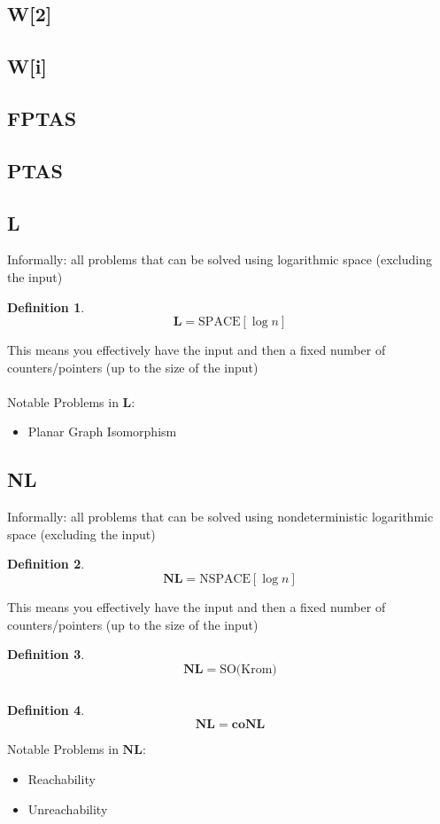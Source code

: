 \documentclass[]{article}
\theoremstyle{definition}
\newtheorem{definition}{Definition}[section]
\begin{document}
\subsection{W[2]}
\subsection{W[i]}
\label{sec:W}
\subsection{FPTAS}

\subsection{PTAS}

\subsection{L}
\label{sec:L}
Informally: all problems that can be solved using logarithmic space (excluding the input)
\\
\begin{definition}
	$$\mathbf{L} = \hyperref[sec:SPACE]{\text{SPACE}[\log n]}$$
\end{definition}
$ $
\\
This means you effectively have the input and then a fixed number of counters/pointers (up to the size of the input)
\\
\\
Notable Problems in $\mathbf{L}$:
\begin{itemize}
	\item Planar Graph Isomorphism
\end{itemize}
\subsection{NL}
\label{sec:NL}
Informally: all problems that can be solved using nondeterministic logarithmic space (excluding the input)
\\
\begin{definition}
	$$\mathbf{NL} = \hyperref[sec:NSPACE]{\text{NSPACE}[\log n]}$$
\end{definition}
$ $
\\
This means you effectively have the input and then a fixed number of counters/pointers (up to the size of the input)
\\
\begin{definition}
	$$\mathbf{NL} = \text{SO(Krom)}$$
\end{definition}
$ $
\\
\begin{definition}
	$$\mathbf{NL} = \mathbf{coNL}$$
\end{definition}
$ $
\\
Notable Problems in $\mathbf{NL}$:
\begin{itemize}
	\item Reachability
	\item Unreachability
\end{itemize}
\end{document}
